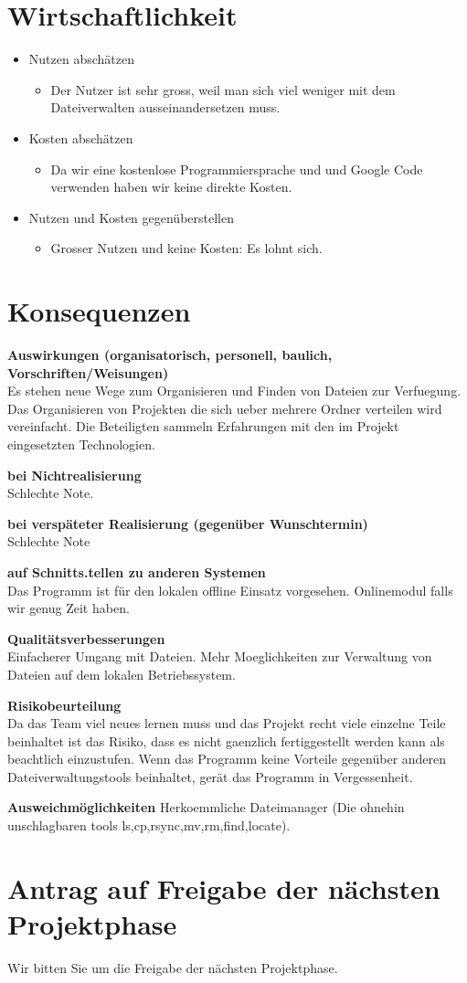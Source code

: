 \documentclass[10pt,paper=a4,final]{scrartcl}
\begin{document}
\section{Wirtschaftlichkeit}
\begin{itemize}
  \item Nutzen abschätzen
    \begin{itemize}
      \item Der Nutzer ist sehr gross, weil man sich viel weniger mit dem Dateiverwalten ausseinandersetzen muss.
    \end{itemize}
  \item Kosten abschätzen
    \begin{itemize}
      \item Da wir eine kostenlose Programmiersprache und und Google Code verwenden haben wir keine direkte Kosten.
    \end{itemize}
  \item Nutzen und Kosten gegenüberstellen
    \begin{itemize}
      \item Grosser Nutzen und keine Kosten: Es lohnt sich.
    \end{itemize}
\end{itemize}
\section{Konsequenzen}
\begin{description}
  \item{\bf Auswirkungen (organisatorisch, personell, baulich, Vorschriften/Weisungen)} \\ Es stehen neue Wege zum Organisieren und Finden von Dateien zur Verfuegung.
    Das Organisieren von Projekten die sich ueber mehrere Ordner verteilen wird vereinfacht.
    Die Beteiligten sammeln Erfahrungen mit den im Projekt eingesetzten Technologien.
  \item{\bf bei Nichtrealisierung} \\ Schlechte Note.
  \item{\bf bei verspäteter Realisierung (gegenüber Wunschtermin)} \\ Schlechte Note
  \item{\bf auf Schnitts.tellen zu anderen Systemen} \\ Das Programm ist f\"ur den lokalen offline Einsatz vorgesehen. Onlinemodul falls wir genug Zeit haben.
  \item{\bf Qualitätsverbesserungen} \\ Einfacherer Umgang mit Dateien. Mehr Moeglichkeiten zur Verwaltung von Dateien auf dem lokalen Betriebssystem.
  \item{\bf Risikobeurteilung} \\ Da das Team viel neues lernen muss und das Projekt recht viele einzelne Teile beinhaltet ist das Risiko, dass es nicht gaenzlich fertiggestellt werden kann als beachtlich einzustufen.
    Wenn das Programm keine Vorteile gegenüber anderen Dateiverwaltungstools beinhaltet, gerät das Programm in Vergessenheit.
  \item{\bf Ausweichmöglichkeiten} Herkoemmliche Dateimanager (Die ohnehin unschlagbaren tools ls,cp,rsync,mv,rm,find,locate).
\end{description}
\section{Antrag auf Freigabe der nächsten Projektphase}
Wir bitten Sie um die Freigabe der nächsten Projektphase.
\end{document}

